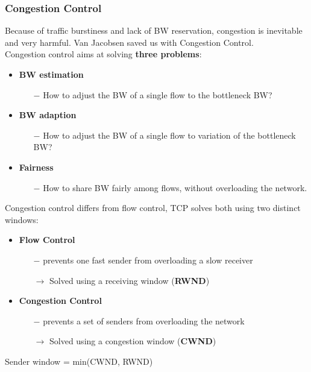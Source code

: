 \documentclass[a4paper, fontsize=8pt, landscape, DIV=1]{scrartcl}
\begin{document}
\begin{multicols*}{4}
		\subsubsection{Congestion Control}
		Because of traffic burstiness and lack of BW reservation, congestion is
		inevitable and very harmful. Van Jacobsen saved us with Congestion Control.\\
		Congestion control aims at solving \textbf{three problems}:
		\begin{itemize}[noitemsep]
			\item \textbf{BW estimation}
			\begin{itemize}
				\item[$-$] How to adjust the BW of a single flow to the bottleneck BW?
			\end{itemize}
			\item \textbf{BW adaption}
			\begin{itemize}
				\item[$-$] How to adjust the BW of a single flow to variation of the
				bottleneck BW?
			\end{itemize}
			\item \textbf{Fairness}
			\begin{itemize}
				\item[$-$] How to share BW fairly among flows, without overloading the
				network.
			\end{itemize} 
		\end{itemize}
		Congestion control differs from flow control, TCP solves both using two
		distinct windows:
		\begin{itemize}[noitemsep]
			\item \textbf{Flow Control}
			\begin{itemize}
				\item[$-$] prevents one fast sender from overloading a slow receiver
				\item[$\rightarrow$] Solved using a receiving window (\textbf{RWND}) 
			\end{itemize}
			\item \textbf{Congestion Control} 
			\begin{itemize}
				\item[$-$] prevents a set of senders from overloading the network
				\item[$\rightarrow$] Solved using a congestion window (\textbf{CWND})
			\end{itemize}
		\end{itemize}
		Sender window = min(CWND, RWND)\par 
		

\end{multicols*}
\end{document}
